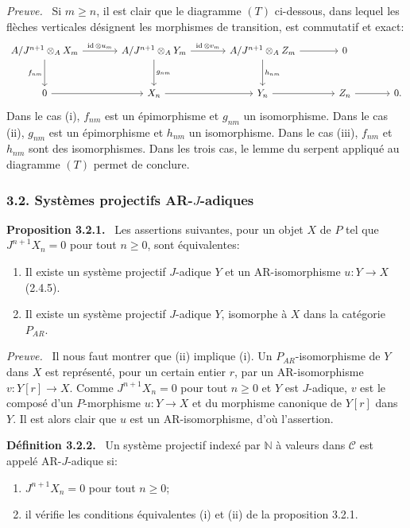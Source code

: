 \documentclass[11pt]{article}
\providecommand{\NN}{\mathbb{N}}
\newenvironment{statement}[1]{\par\medskip\noindent\textbf{#1.}\ }{\par\medskip}
\newenvironment{prooftext}[1][Proof]{\par\noindent\emph{#1.}\ }{\par\medskip}
\providecommand{\id}{\operatorname{id}}
\providecommand{\NN}{\mathbb N}
\providecommand{\cC}{\mathcal C}
\providecommand{\id}{\operatorname{id}}
\providecommand{\id}{\operatorname{id}}
\providecommand{\id}{\operatorname{id}}
\providecommand{\id}{\operatorname{id}}
\providecommand{\cC}{\mathcal C}
\providecommand{\id}{\operatorname{id}}
\begin{document}
\begin{prooftext}[Preuve]
Si $m\ge n$, il est clair que le diagramme $(T)$ ci-dessous, dans lequel les flèches verticales désignent les morphismes de transition, est commutatif et exact:
\[
\begin{tikzcd}[column sep=large,row sep=large]
A/J^{n+1}\otimes_A X_m \arrow[r,"\id\otimes u_m"] \arrow[d,"f_{nm}"'] & A/J^{n+1}\otimes_A Y_m \arrow[r,"\id\otimes v_m"] \arrow[d,"g_{nm}"] & A/J^{n+1}\otimes_A Z_m \arrow[r] \arrow[d,"h_{nm}"] & 0\\
0 \arrow[r] & X_n \arrow[r] & Y_n \arrow[r] & Z_n \arrow[r] & 0 .
\end{tikzcd}
\]
Dans le cas (i), $f_{nm}$ est un épimorphisme et $g_{nm}$ un isomorphisme. Dans le cas (ii), $g_{nm}$ est un épimorphisme et $h_{nm}$ un isomorphisme. Dans le cas (iii), $f_{nm}$ et $h_{nm}$ sont des isomorphismes. Dans les trois cas, le lemme du serpent appliqué au diagramme $(T)$ permet de conclure.
\end{prooftext}

\subsubsection*{3.2. Systèmes projectifs AR-$J$-adiques}
\begin{statement}{Proposition 3.2.1}
Les assertions suivantes, pour un objet $X$ de $P$ tel que $J^{n+1}X_n=0$ pour tout $n\ge0$, sont équivalentes:
\begin{enumerate}[label=(\roman*)]
\item Il existe un système projectif $J$-adique $Y$ et un AR-isomorphisme $u:Y\to X$ (2.4.5).
\item Il existe un système projectif $J$-adique $Y$, isomorphe à $X$ dans la catégorie $P_{AR}$.
\end{enumerate}
\end{statement}

\begin{prooftext}[Preuve]
Il nous faut montrer que (ii) implique (i). Un $P_{AR}$-isomorphisme de $Y$ dans $X$ est représenté, pour un certain entier $r$, par un AR-isomorphisme $v:Y[r]\to X$. Comme $J^{n+1}X_n=0$ pour tout $n\ge0$ et $Y$ est $J$-adique, $v$ est le composé d'un $P$-morphisme $u:Y\to X$ et du morphisme canonique de $Y[r]$ dans $Y$. Il est alors clair que $u$ est un AR-isomorphisme, d'où l'assertion.
\end{prooftext}

\begin{statement}{Définition 3.2.2}
Un système projectif indexé par $\NN$ à valeurs dans $\cC$ est appelé AR-$J$-adique si:
\begin{enumerate}[label=(\alph*)]
\item $J^{n+1}X_n=0$ pour tout $n\ge0$;
\item il vérifie les conditions équivalentes (i) et (ii) de la proposition 3.2.1.
\end{enumerate}
\end{statement}
\end{document}
